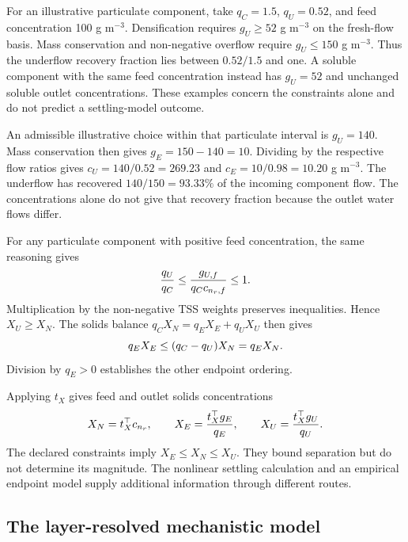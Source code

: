 For an illustrative particulate component, take $q_C=1.5$, $q_U=0.52$, and feed concentration 100 g m$^{-3}$. Densification requires $g_U\ge52$ g m$^{-3}$ on the fresh-flow basis. Mass conservation and non-negative overflow require $g_U\le150$ g m$^{-3}$. Thus the underflow recovery fraction lies between $0.52/1.5$ and one. A soluble component with the same feed concentration instead has $g_U=52$ and unchanged soluble outlet concentrations. These examples concern the constraints alone and do not predict a settling-model outcome.

An admissible illustrative choice within that particulate interval is $g_U=140$. Mass conservation then gives $g_E=150-140=10$. Dividing by the respective flow ratios gives $c_U=140/0.52=269.23$ and $c_E=10/0.98=10.20$ g m$^{-3}$. The underflow has recovered $140/150=93.33\%$ of the incoming component flow. The concentrations alone do not give that recovery fraction because the outlet water flows differ.

For any particulate component with positive feed concentration, the same reasoning gives
\begin{equation}
\equationname{Bounds on the fraction of feed particulate material recovered in underflow}
\frac{q_U}{q_C}\le\frac{g_{U,f}}{q_Cc_{n_r,f}}\le1.
\end{equation}
Multiplication by the non-negative TSS weights preserves inequalities. Hence $X_U\ge X_N$. The solids balance $q_CX_N=q_EX_E+q_UX_U$ then gives
\begin{equation}
\equationname{Overflow solids bound implied by particulate densification}
q_EX_E\le(q_C-q_U)X_N=q_EX_N.
\end{equation}
Division by $q_E>0$ establishes the other endpoint ordering.

Applying $t_X$ gives feed and outlet solids concentrations
\begin{equation}
\equationname{Feed, overflow, and underflow suspended-solids concentrations}
X_N=t_X^\top c_{n_r},\qquad
X_E=\frac{t_X^\top g_E}{q_E},\qquad
X_U=\frac{t_X^\top g_U}{q_U}.
\label{eq:plant_tss_endpoints}
\end{equation}
The declared constraints imply $X_E\le X_N\le X_U$. They bound separation but do not determine its magnitude. The nonlinear settling calculation and an empirical endpoint model supply additional information through different routes.

\subsection{The layer-resolved mechanistic model}

